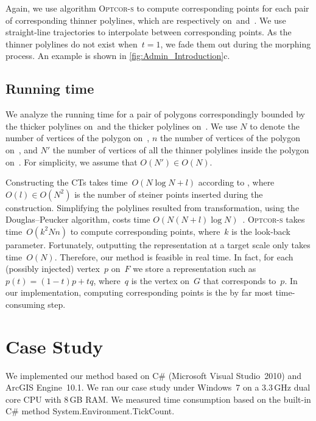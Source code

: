 Again, we use algorithm \textsc{Optcor-s} 
to compute corresponding points
for each pair of corresponding thinner polylines, 
which are respectively on~\ml and~\ms. 
We use straight-line trajectories
to interpolate between corresponding points. 
As the thinner polylines do not exist when~$t=1$, 
we fade them out during the morphing process. 
An example is shown in \fig\ref{fig:Admin_Introduction}c.

\subsection{Running time}
\label{sec:Admin_Runningtime} 

We analyze the running time for a pair of polygons correspondingly bounded by 
the thicker polylines on~\ml and the thicker polylines on~\ms. 
We use $N$ to denote 
the number of vertices of the polygon on~\ml, 
$n$ the number of vertices of the polygon on~\ms, 
and $N'$ the number of vertices of all the thinner polylines 
inside the polygon on~\ml. 
For simplicity, we assume that $O(N')\in O(N)$.

Constructing the CTs takes time~$O(N\log N + l)$ 
according to \textcite{AronovSS93}, 
where~$O(l)\in O(N^2)$ is the number of steiner points 
inserted during the construction.
Simplifying the polylines resulted from transformation, 
using the Douglas--Peucker algorithm, 
costs time 
$O(N(N+l)\log{N})$~\parencite{Hershberger92speedingup}.  
\textsc{Optcor-s} takes time~$O(k^2Nn)$ 
to compute corresponding points, 
where~$k$ is the look-back parameter. 
Fortunately, outputting the representation at a target scale 
only takes time~$O(N)$.
Therefore, our method is feasible in real time. 
In fact, for each (possibly injected) vertex~$p$ on~$F$ 
we store a representation such as~$p(t)=(1-t)p+tq$,
where~$q$ is the vertex on~$G$ that corresponds to~$p$. 
In our implementation, computing corresponding points
is the by far most time-consuming step.



\section{Case Study}
\label{sec:Admin_CaseStudy}

We implemented our method based on 
C\# (Microsoft Visual Studio~2010) and ArcGIS Engine~10.1. 
We ran our case study under 
Windows~7 on a $3.3\,$GHz dual core CPU with $8\,$GB RAM. 
We measured time consumption based on the
built-in C\# method System.Environment.TickCount.


